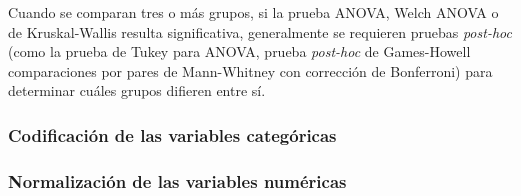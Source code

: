 \begin{tcolorbox}
\begin{itemize}
        Cuando se comparan tres o más grupos, si la prueba ANOVA, Welch ANOVA o de Kruskal-Wallis resulta significativa, generalmente se requieren pruebas \textit{post-hoc} (como la prueba de Tukey para ANOVA, prueba \textit{post-hoc} de Games-Howell comparaciones por pares de Mann-Whitney con corrección de Bonferroni) para determinar cuáles grupos difieren entre sí.
        
    \end{itemize}
    
\end{tcolorbox}






\subsubsection{Codificación de las variables categóricas}


\subsubsection{Normalización de las variables numéricas}

